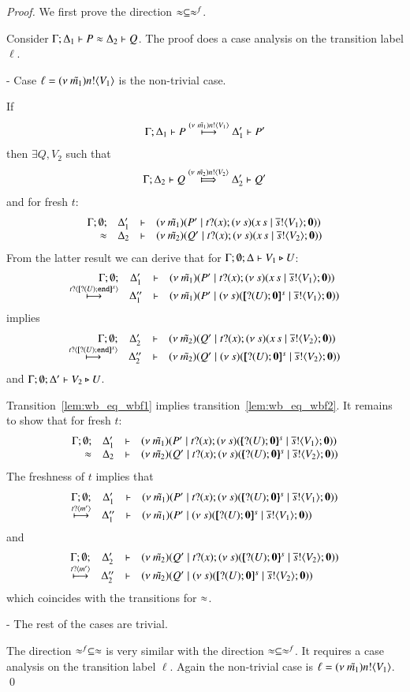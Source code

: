 \begin{proof}
	\noi We first prove the direction $\approx \subseteq \approx^{f}$.

	\noi Consider $\Gamma; \Delta_1 \vdash P \approx \Delta_2 \vdash Q$.
	The proof does a case analysis on the transition label $\ell$.

	\noi - Case $\ell = (\nu\ \tilde{m_1}) n ! \langle V_1 \rangle$ is the non-trivial case.

	\noi If
%
	\begin{eqnarray}
		\Gamma; \Delta_1 \vdash P \stackrel{(\nu\ \tilde{m_1}) n ! \langle V_1 \rangle}{\longmapsto} \Delta_1' \vdash P'
		\label{lem:wb_eq_wbf1}
	\end{eqnarray}
	then $\exists Q, V_2$ such that
%
	\begin{eqnarray}
		\horel{\Gamma}{\Delta_2}{Q}{\Hby{\news{\tilde{m_2}} \bactout{n}{V_2}}}{\Delta_2'}{Q'}
		\label{lem:wb_eq_wbf2}
	\end{eqnarray}
%
	and for fresh $t$:
	\[
		\begin{array}{rcll} \Gamma; \emptyset; &\Delta_1'& \vdash& (\nu\ \tilde{m_1})(P' \;|\; t ? (x) ; (\nu\ s)(x\,s \;|\; \overline{s} ! \langle V_1 \rangle ; \mathbf{0}))\\ \approx &\Delta_2& \vdash &  (\nu\ \tilde{m_2})(Q' \;|\; t ? (x) ; (\nu\ s)(x\,s \;|\; \overline{s} ! \langle V_2 \rangle ; \mathbf{0})) \end{array}
	\]
%
	From the latter result we can derive that for $\Gamma; \emptyset; \Delta \vdash V_1 \triangleright U$:
%
	\[
		\mhorel{\Gamma}{\Delta_1'}{\newsp{\tilde{m_1}}{P' \Par \hotrigger{t}{x}{s}{V_1}}}
		{\hby{\bactinp{t}{\map{\btinp{U} \tinact}^{x}}}}
		{\Delta_1''}{}{\newsp{\tilde{m_1}}{P' \Par \newsp{s}{\map{\btinp{U} \inact}^{s} \Par \bout{\dual{s}}{V_1} \inact}}}
	\]
%
	\noi implies
%
	\[
		\mhorel{\Gamma}{\Delta_2'}{\newsp{\tilde{m_2}}{Q' \Par \hotrigger{t}{x}{s}{V_2}}}
		{\hby{\bactinp{t}{\map{\btinp{U} \tinact}^{x}}}}
		{\Delta_2''}{}{\newsp{\tilde{m_2}}{Q' \Par \newsp{s}{\map{\btinp{U} \inact}^{s} \Par \bout{\dual{s}}{V_2} \inact}}}
	\]
%
	\noi and $\Gamma; \emptyset; \Delta' \vdash V_2 \triangleright U$.

	\noi Transition~\ref{lem:wb_eq_wbf1} implies transition~\ref{lem:wb_eq_wbf2}. It remains to
	show that for fresh $t$:
%
	\[
		\mhorel{\Gamma}{\Delta_1'}{\newsp{\tilde{m_1}}{P' \Par \fotrigger{t}{x}{s}{\btinp{U} \inact}{V_1}}}
		{\wb}
		{\Delta_2}{}{\newsp{\tilde{m_2}}{Q' \Par \fotrigger{t}{x}{s}{\btinp{U} \inact}{V_2}}}
	\]
%
	The freshness of $t$ implies that
	\[
		\mhorel{\Gamma}{\Delta_1'}{\newsp{\tilde{m_1}}{P' \Par \fotrigger{t}{x}{s}{\btinp{U} \inact}{V_1}}}
		{\hby{\bactinp{t}{m'}}}
		{\Delta_1''}{}{\newsp{\tilde{m_1}}{P' \Par \newsp{s}{\map{\btinp{U} \inact}^{s} \Par \bout{\dual{s}}{V_1} \inact}}}
	\]
	\noi and
%
	\[
		\mhorel{\Gamma}{\Delta_2'}{\newsp{\tilde{m_2}}{Q' \Par \fotrigger{t}{x}{s}{\btinp{U} \inact}{V_2}}}
		{\hby{\bactinp{t}{m'}}}
		{\Delta_2''}{}{\newsp{\tilde{m_2}}{Q' \Par \newsp{s}{\map{\btinp{U} \inact}^{s} \Par \bout{\dual{s}}{V_2} \inact}}}
	\]
%
	\noi which coincides with the transitions for $\approx$.

	\noi - The rest of the cases are trivial.

	\noi The direction $\approx^{f} \subseteq \approx$ is very similar with the
	direction $\approx \subseteq \approx^{f}$. It requires a case analysis
	on the transition label $\ell$. Again the non-trivial case is
	$\ell = (\nu\ \tilde{m_1}) n ! \langle V_1 \rangle$.
	\qed
\end{proof}


